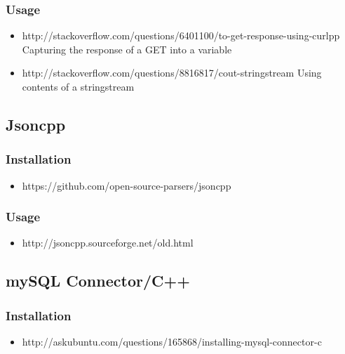 \documentclass[12pt]{article}
\begin{document}
	\subsubsection{Usage}
		\begin{itemize}
			\item http://stackoverflow.com/questions/6401100/to-get-response-using-curlpp
			\subitem Capturing the response of a GET into a variable
			\item http://stackoverflow.com/questions/8816817/cout-stringstream
			\subitem Using contents of a stringstream
		\end{itemize}
	\subsection{Jsoncpp}
	\subsubsection{Installation}
		\begin{itemize}
			\item https://github.com/open-source-parsers/jsoncpp
		\end{itemize}
	\subsubsection{Usage}
		\begin{itemize}
			\item http://jsoncpp.sourceforge.net/old.html
		\end{itemize}
	\subsection{mySQL Connector/C++}
	\subsubsection{Installation}
		\begin{itemize}
			\item http://askubuntu.com/questions/165868/installing-mysql-connector-c
		\end{itemize}
\end{document}
